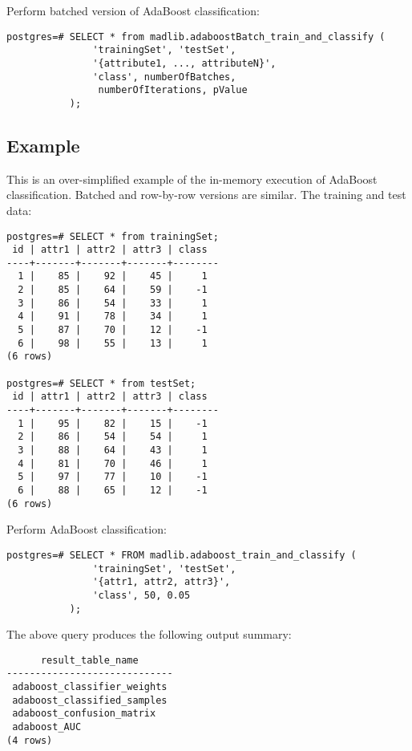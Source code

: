 {\raggedleft Perform batched version of AdaBoost classification:}

\begin{verbatim}
postgres=# SELECT * from madlib.adaboostBatch_train_and_classify (
               'trainingSet', 'testSet', 
               '{attribute1, ..., attributeN}', 
               'class', numberOfBatches,
                numberOfIterations, pValue
           );
\end{verbatim}

\subsection*{Example}
This is an over-simplified example of the in-memory execution of AdaBoost classification. Batched and row-by-row versions are similar.
\vspace{\baselineskip}
{\raggedleft The training and test data:}

\begin{verbatim}
postgres=# SELECT * from trainingSet;
 id | attr1 | attr2 | attr3 | class 
----+-------+-------+-------+--------
  1 |    85 |    92 |    45 |     1 
  2 |    85 |    64 |    59 |    -1 
  3 |    86 |    54 |    33 |     1 
  4 |    91 |    78 |    34 |     1 
  5 |    87 |    70 |    12 |    -1 
  6 |    98 |    55 |    13 |     1 
(6 rows)

postgres=# SELECT * from testSet;
 id | attr1 | attr2 | attr3 | class 
----+-------+-------+-------+--------
  1 |    95 |    82 |    15 |    -1 
  2 |    86 |    54 |    54 |     1 
  3 |    88 |    64 |    43 |     1 
  4 |    81 |    70 |    46 |     1 
  5 |    97 |    77 |    10 |    -1 
  6 |    88 |    65 |    12 |    -1 
(6 rows)
\end{verbatim}

{\raggedleft Perform AdaBoost classification:}

\begin{verbatim}
postgres=# SELECT * FROM madlib.adaboost_train_and_classify (
               'trainingSet', 'testSet', 
               '{attr1, attr2, attr3}', 
               'class', 50, 0.05
           );
\end{verbatim}

{\raggedleft The above query produces the following output summary:}

\begin{verbatim}
      result_table_name      
-----------------------------
 adaboost_classifier_weights
 adaboost_classified_samples
 adaboost_confusion_matrix
 adaboost_AUC
(4 rows)
\end{verbatim}

